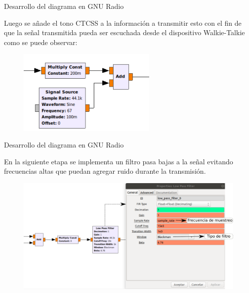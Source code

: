 \begin{frame}{Desarrollo del diagrama en GNU Radio}

Luego se añade el tono CTCSS a la información a transmitir esto con el fin de que la señal transmitida pueda ser escuchada desde el dispositivo Walkie-Talkie como se puede observar:

\begin{figure}[H]
\centering
\vspace{-3mm}
\includegraphics[width=0.6\textwidth]{parte3/lab14/pdf/Lab14_4.pdf}
\end{figure}

\end{frame}

\begin{frame}{Desarrollo del diagrama en GNU Radio}

En la siguiente etapa se implementa un filtro pasa bajas a la señal evitando frecuencias altas que puedan agregar ruido durante la transmisión.

\begin{figure}[H]
\centering
\vspace{-3mm}
\includegraphics[width=\textwidth]{parte3/lab14/pdf/Lab14_5.pdf}
\end{figure}


\end{frame}

